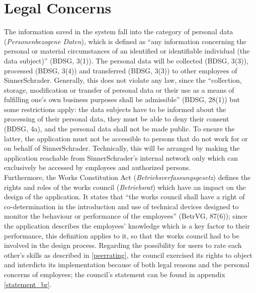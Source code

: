\section{Legal Concerns}
\label{legal_concerns}
The information saved in the system fall into the category of personal data (\textit{Personenbezogene Daten}), which is defined as ``any information concerning the personal or material circumstances of an identified or identifiable individual (the data subject)'' (BDSG, 3(1)). The personal data will be collected (BDSG, 3(3)), processed (BDSG, 3(4)) and transferred (BDSG, 3(3)) to other employees of SinnerSchrader.
Generally, this does not violate any law, since the ``collection, storage, modification or transfer of personal data or their use as a means of fulfilling one’s own business purposes shall be admissible'' (BDSG, 28(1)) but some restrictions apply: the data subjects have to be informed about the processing of their personal data, they must be able to deny their consent (BDSG, 4a), and the personal data shall not be made public.
To ensure the latter, the application must not be accessible to persons that do not work for or on behalf of SinnerSchrader. Technically, this will be arranged by making the application reachable from SinnerSchrader's internal network only which can exclusively be accessed by employees and authorized persons.\\
Furthermore, the Works Constitution Act (\textit{Betriebsverfassungsgesetz}) defines the rights and roles of the works council (\textit{Betriebsrat}) which have an impact on the design of the application. It states that ``the works council shall have a right of co-determination in the introduction and use of technical devices designed to monitor the behaviour or performance of the employees'' (BetrVG, 87(6)); since the application describes the employees' knowledge which is a key factor to their performance, this definition applies to it, so that the works council had to be involved in the design process.
Regarding the possibility for users to rate each other's skills as described in \ref{peerrating}, the council exercised its rights to object and interdicts its implementation because of both legal reasons and the personal concerns of employees; the council's statement can be found in appendix \ref{statement_br}.
